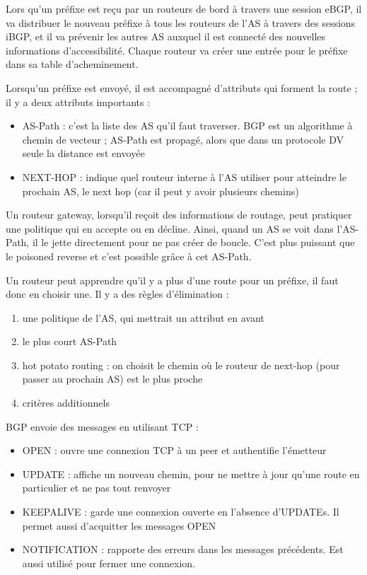 	Lors qu'un préfixe est reçu par un routeurs de bord à travers une session eBGP, il va distribuer le nouveau préfixe à tous les routeurs de l'AS à travers des sessions iBGP, et il va prévenir les autres AS auxquel il est connecté des nouvelles informations d'accessibilité. Chaque routeur va créer une entrée pour le préfixe dans sa table d'acheminement.
	
	
	Lorsqu'un préfixe est envoyé, il est accompagné d'attributs qui forment la route ; il y a deux attributs importants :
	
	\begin{itemize}
		\item AS-Path : c'est la liste des AS qu'il faut traverser. BGP est un algorithme à chemin de vecteur ; AS-Path est propagé, alors que dans un protocole DV seule la distance est envoyée
		\item NEXT-HOP : indique quel routeur interne à l'AS utiliser pour atteindre le prochain AS, le next hop (car il peut y avoir plusieurs chemins)
	\end{itemize}
	
	Un routeur gateway, lorsqu'il reçoit des informations de routage, peut pratiquer une politique qui en accepte ou en décline. Ainsi, quand un AS se voit dans l'AS-Path, il le jette directement pour ne pas créer de boucle. C'est plus puissant que le poisoned reverse et c'est possible grâce à cet AS-Path.
	
	
	
	Un routeur peut apprendre qu'il y a plus d'une route pour un préfixe, il faut donc en choisir une. Il y a des règles d'élimination :
	
	\begin{enumerate}
		\item une politique de l'AS, qui mettrait un attribut en avant
		\item le plus court AS-Path
		\item hot potato routing : on choisit le chemin où le routeur de next-hop (pour passer au prochain AS) est le plus proche
		\item critères additionnels
	\end{enumerate}
			
	
	BGP envoie des messages en utilisant TCP :
	
	\begin{itemize}
		\item OPEN : ouvre une connexion TCP à un peer et authentifie l'émetteur
		\item UPDATE : affiche un nouveau chemin, pour ne mettre à jour qu'une route en particulier et ne pas tout renvoyer
		\item KEEPALIVE : garde une connexion ouverte en l'absence d'UPDATEs. Il permet aussi d'acquitter les messages OPEN
		\item NOTIFICATION : rapporte des erreurs dans les messages précédents. Est aussi utilisé pour fermer une connexion.
	\end{itemize}
	
